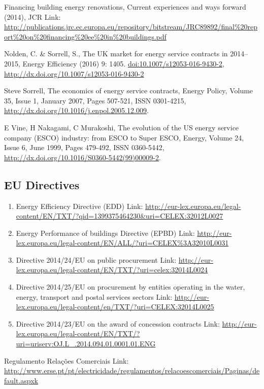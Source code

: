 \documentclass[]{book}
\theoremstyle{definition}
\theoremstyle{definition}
\theoremstyle{definition}
\theoremstyle{remark}
\begin{document}
Financing building energy renovations, Current experiences and ways
forward (2014), JCR Link:
\url{http://publications.jrc.ec.europa.eu/repository/bitstream/JRC89892/final\%20report\%20on\%20financing\%20ee\%20in\%20buildings.pdf}

Nolden, C. \& Sorrell, S., The UK market for energy service contracts in
2014--2015, Energy Efficiency (2016) 9: 1405.
\url{doi:10.1007/s12053-016-9430-2},
\url{http://dx.doi.org/10.1007/s12053-016-9430-2}

Steve Sorrell, The economics of energy service contracts, Energy Policy,
Volume 35, Issue 1, January 2007, Pages 507-521, ISSN 0301-4215,
\url{http://dx.doi.org/10.1016/j.enpol.2005.12.009}.

E Vine, H Nakagami, C Murakoshi, The evolution of the US energy service
company (ESCO) industry: from ESCO to Super ESCO, Energy, Volume 24,
Issue 6, June 1999, Pages 479-492, ISSN 0360-5442,
\url{http://dx.doi.org/10.1016/S0360-5442(99)00009-2}.

\subsection{EU Directives}\label{eu-directives-1}

\begin{enumerate}
\def\labelenumi{\arabic{enumi}.}
\item
  Energy Efficiency Directive (EDD) Link:
  \url{http://eur-lex.europa.eu/legal-content/EN/TXT/?qid=1399375464230\&uri=CELEX:32012L0027}
\item
  Energy Performance of buildings Directive (EPBD) Link:
  \url{http://eur-lex.europa.eu/legal-content/EN/ALL/?uri=CELEX\%3A32010L0031}
\item
  Directive 2014/24/EU on public procurement Link:
  \url{http://eur-lex.europa.eu/legal-content/EN/TXT/?uri=celex:32014L0024}
\item
  Directive 2014/25/EU on procurement by entities operating in the
  water, energy, transport and postal services sectors Link:
  \url{http://eur-lex.europa.eu/legal-content/en/TXT/?uri=CELEX:32014L0025}
\item
  Directive 2014/23/EU on the award of concession contracts Link:
  \url{http://eur-lex.europa.eu/legal-content/EN/TXT/?uri=uriserv:OJ.L_.2014.094.01.0001.01.ENG}
\end{enumerate}

Regulamento Relações Comerciais Link:
\url{http://www.erse.pt/pt/electricidade/regulamentos/relacoescomerciais/Paginas/default.aspxk}
\end{document}
